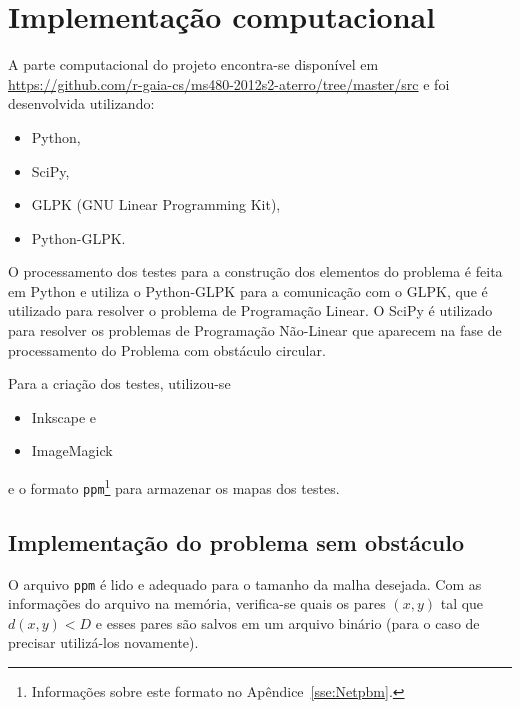 %
%
%

\section{Implementa\c{c}\~{a}o computacional}
A parte computacional do projeto encontra-se disponível em
\url{https://github.com/r-gaia-cs/ms480-2012s2-aterro/tree/master/src} e foi
desenvolvida utilizando:
\begin{itemize}
    \item Python\nocite{Python},
    \item SciPy\nocite{SciPy},
    \item GLPK (GNU Linear Programming Kit)\nocite{GLPK},
    \item Python-GLPK.
\end{itemize}

O processamento dos testes para a construção dos elementos do problema é feita
em Python e utiliza o Python-GLPK para a comunicação com o GLPK, que é utilizado
para resolver o problema de Programação Linear. O SciPy é utilizado para
resolver os problemas de Programação Não-Linear que aparecem na fase de
processamento do Problema com obstáculo circular.

Para a criação dos testes, utilizou-se
\begin{itemize}
    \item Inkscape e
    \item ImageMagick
\end{itemize}
e o formato \texttt{ppm}\footnote{Informações sobre este formato no
Apêndice~\ref{sse:Netpbm}.} para armazenar os mapas dos testes.

\subsection{Implementação do problema sem obstáculo}
O arquivo \texttt{ppm} é lido e adequado para o tamanho da malha
desejada. Com as informações do arquivo na memória, verifica-se quais os pares
$(x, y)$ tal que $d(x, y) < D$ e esses pares são salvos em um
arquivo binário (para o caso de precisar utilizá-los novamente).

